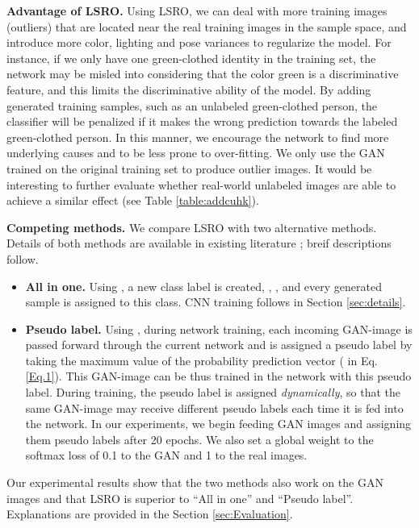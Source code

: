 \documentclass[10pt,twocolumn,letterpaper]{article}
\begin{document}
\textbf{Advantage of LSRO.} Using LSRO, we can deal with more training images (outliers) that are located near the real training images in the sample space, and introduce more color, lighting and pose variances to regularize the model. For instance, if we only have one green-clothed identity in the training set, the network may be misled into considering that the color green is a discriminative feature, and this limits the discriminative ability of the model. By adding generated training samples, such as an unlabeled green-clothed person, the classifier will be penalized if it makes the wrong prediction towards the labeled green-clothed person. In this manner, we encourage the network to find more underlying causes and to be less prone to over-fitting. We only use the GAN trained on the original training set to produce outlier images. It would be interesting to further evaluate whether real-world unlabeled images are able to achieve a similar effect (see Table \ref{table:addcuhk}).

\textbf{Competing methods.} We compare LSRO with two alternative methods. Details of both methods are available in existing literature \cite{odena2016semi,salimans2016improved,lee2013pseudo}; breif descriptions follow.
\begin{itemize}
\item \textbf{All in one.} Using \cite{odena2016semi,salimans2016improved}, a new class label is created, \ie, , and every generated sample is assigned to this class. CNN training follows in Section \ref{sec:details}.
\item \textbf{Pseudo label.} Using \cite{lee2013pseudo}, during network training, each incoming GAN-image is passed forward through the current network and is assigned a pseudo label by taking the maximum value of the probability prediction vector ( in Eq. \ref{Eq.1}). This GAN-image can be thus trained in the network with this pseudo label. During training, the pseudo label is assigned \emph{dynamically}, so that the same GAN-image may receive different pseudo labels each time it is fed into the network. In our experiments, we begin feeding GAN images and assigning them pseudo labels after 20 epochs. We also set a global weight to the softmax loss of 0.1 to the GAN and 1 to the real images.
\end{itemize}

Our experimental results show that the two methods also work on the GAN images and that LSRO is superior to ``All in one'' and ``Pseudo label''. Explanations are provided in the Section \ref{sec:Evaluation}.
\end{document}
